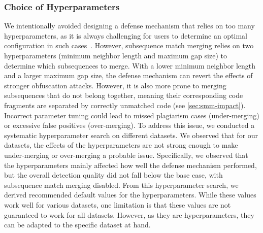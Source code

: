     \subsubsection{Choice of Hyperparameters}
    We intentionally avoided designing a defense mechanism that relies on too many hyperparameters, as it is always challenging for users to determine an optimal configuration in such cases~\cite{Schmid2022}.
    However, subsequence match merging relies on two hyperparameters (minimum neighbor length and maximum gap size) to determine which subsequences to merge. With a lower minimum neighbor length and a larger maximum gap size, the defense mechanism can revert the effects of stronger obfuscation attacks. However, it is also more prone to merging subsequences that do not belong together, meaning their corresponding code fragments are separated by correctly unmatched code (see \autoref{sec:smm-impact}).
    Incorrect parameter tuning could lead to missed plagiarism cases (under-merging) or excessive false positives (over-merging). To address this issue, we conducted a systematic hyperparameter search on different datasets. We observed that for our datasets, the effects of the hyperparameters are not strong enough to make under-merging or over-merging a probable issue. Specifically, we observed that the hyperparameters mainly affected how well the defense mechanism performed, but the overall detection quality did not fall below the base case, with subsequence match merging disabled.
    From this hyperparameter search, we derived recommended default values for the hyperparameters.
    While these values work well for various datasets, one limitation is that these values are not guaranteed to work for all datasets.
    However, as they are hyperparameters, they can be adapted to the specific dataset at hand.
    